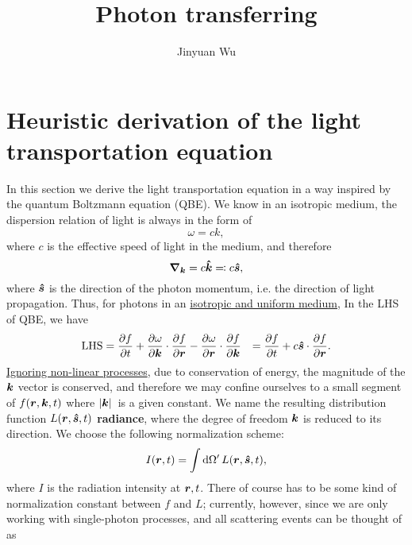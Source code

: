 \documentclass[hyperref, a4paper]{article}
\title{Photon transferring}
\author{Jinyuan Wu}
\newcommand*{\concept}[1]{{\textbf{#1}}}
\def\\{}%
\begin{document}
\maketitle

\section{Heuristic derivation of the light transportation equation}

In this section we derive the light transportation equation 
in a way inspired by the quantum Boltzmann equation (QBE).
We know in an isotropic medium, the dispersion relation of light is always 
in the form of 
\begin{equation}
    \omega = c k,  
\end{equation}
where $c$ is the effective speed of light in the medium, 
and therefore 
\begin{equation}
    \grad_{\vb*{k}} = c \vu*{k} \eqqcolon c \vu*{s},
\end{equation}
where $\vu*{s}$ is the direction of the photon momentum, 
i.e. the direction of light propagation.
Thus, for photons in an \ul{isotropic and uniform medium}, 
In the LHS of QBE, we have 
\begin{equation}
    \begin{aligned}
        \text{LHS} &= \pdv{f}{t} + \pdv{\omega}{\vb*{k}} \cdot \pdv{f}{\vb*{r}}
        - \pdv{\omega}{\vb*{r}} \cdot \pdv{f}{\vb*{k}} \\
        &= \pdv{f}{t} + c \vu*{s} \cdot \pdv{f}{\vb*{r}}.
    \end{aligned}
\end{equation}
\ul{Ignoring non-linear processes}, due to conservation of energy, 
the magnitude of the $\vb*{k}$ vector is conserved, 
and therefore we may confine ourselves to 
a small segment of $f(\vb*{r}, \vb*{k}, t)$
where $\abs*{\vb*{k}}$ is a given constant.
We name the resulting distribution function $L(\vb*{r}, \vu*{s}, t)$
\concept{radiance}, 
where the degree of freedom $\vb*{k}$ 
is reduced to its direction.
We choose the following normalization scheme: 
\begin{equation}
    I(\vb*{r}, t) = \int \dd{\Omega'} L(\vb*{r}, \vu*{s}, t),
\end{equation}
where $I$ is the radiation intensity at $\vb*{r}, t$. 
There of course has to be some kind of normalization constant 
between $f$ and $L$; 
currently, however, since we are only working with single-photon processes, 
and all scattering events can be thought of as 
\end{document}
